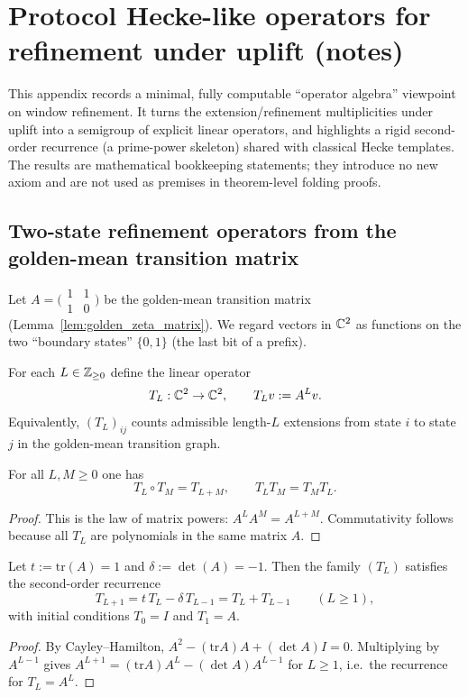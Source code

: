 \section{Protocol Hecke-like operators for refinement under uplift (notes)}
\label{app:protocol_hecke_operators}

\AuditTag This appendix records a minimal, fully computable ``operator algebra'' viewpoint on window refinement.
It turns the extension/refinement multiplicities under uplift into a semigroup of explicit linear operators, and highlights a rigid second-order recurrence (a prime-power skeleton) shared with classical Hecke templates.
The results are mathematical bookkeeping statements; they introduce no new axiom and are not used as premises in theorem-level folding proofs.

\subsection{Two-state refinement operators from the golden-mean transition matrix}
\label{subsec:protocol_hecke_two_state}

Let $A=\bigl(\begin{smallmatrix}1&1\\1&0\end{smallmatrix}\bigr)$ be the golden-mean transition matrix (Lemma~\ref{lem:golden_zeta_matrix}).
We regard vectors in $\mathbb{C}^2$ as functions on the two ``boundary states'' $\{0,1\}$ (the last bit of a prefix).

\begin{definition}\label{def:refinement_operators_TL}
\MathTag For each $L\in\mathbb{Z}_{\ge 0}$ define the linear operator
\[
T_L:\mathbb{C}^2\to\mathbb{C}^2,\qquad T_L v:=A^L v.
\]
Equivalently, $(T_L)_{ij}$ counts admissible length-$L$ extensions from state $i$ to state $j$ in the golden-mean transition graph.
\end{definition}

\begin{proposition}\label{prop:TL_semigroup_commute}
\MathTag For all $L,M\ge 0$ one has
\[
T_L\circ T_M=T_{L+M},\qquad T_L T_M=T_M T_L.
\]
\end{proposition}
\begin{proof}
This is the law of matrix powers: $A^{L}A^{M}=A^{L+M}$.
Commutativity follows because all $T_L$ are polynomials in the same matrix $A$.
\end{proof}

\begin{proposition}\label{prop:TL_prime_power_recurrence}
\MathTag Let $t:=\mathrm{tr}(A)=1$ and $\delta:=\det(A)=-1$.
Then the family $(T_L)$ satisfies the second-order recurrence
\[
T_{L+1}=t\,T_L-\delta\,T_{L-1}=T_L+T_{L-1}\qquad(L\ge 1),
\]
with initial conditions $T_0=I$ and $T_1=A$.
\end{proposition}
\begin{proof}
By Cayley--Hamilton, $A^2-(\mathrm{tr}A)A+(\det A)I=0$.
Multiplying by $A^{L-1}$ gives $A^{L+1}=(\mathrm{tr}A)A^L-(\det A)A^{L-1}$ for $L\ge 1$, i.e.\ the recurrence for $T_L=A^L$.
\end{proof}

